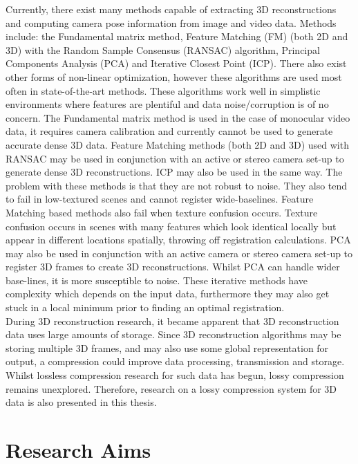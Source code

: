 Currently, there exist many methods capable of extracting 3D reconstructions and computing camera pose information from image and video data. Methods include: the Fundamental matrix method, Feature Matching (FM) (both 2D and 3D) with the Random Sample Consensus (RANSAC) algorithm, Principal Components Analysis (PCA) and Iterative Closest Point (ICP). There also exist other forms of non-linear optimization, however these algorithms are used most often in state-of-the-art methods. These algorithms work well in simplistic environments where features are plentiful and data noise/corruption is of no concern. The Fundamental matrix method is used in the case of monocular video data, it requires camera calibration and currently cannot be used to generate accurate dense 3D data. Feature Matching methods (both 2D and 3D) used with RANSAC may be used in conjunction with an active or stereo camera set-up to generate dense 3D reconstructions. ICP may also be used in the same way. The problem with these methods is that they are not robust to noise. They also tend to fail in low-textured scenes and cannot register wide-baselines. Feature Matching based methods also fail when texture confusion occurs. Texture confusion occurs in scenes with many features which look identical locally but appear in different locations spatially, throwing off registration calculations. PCA may also be used in conjunction with an active camera or stereo camera set-up to register 3D frames to create 3D reconstructions. Whilst PCA can handle wider base-lines, it is more susceptible to noise. These iterative methods have complexity which depends on the input data, furthermore they may also get stuck in a local minimum prior to finding an optimal registration. \\


During 3D reconstruction research, it became apparent that 3D reconstruction data uses large amounts of storage. Since 3D reconstruction algorithms may be storing multiple 3D frames, and may also use some global representation for output, a compression could improve data processing, transmission and storage. Whilst lossless compression research for such data has begun, lossy compression remains unexplored. Therefore, research on a lossy compression system for 3D data is also presented in this thesis. \\


\section{Research Aims}

